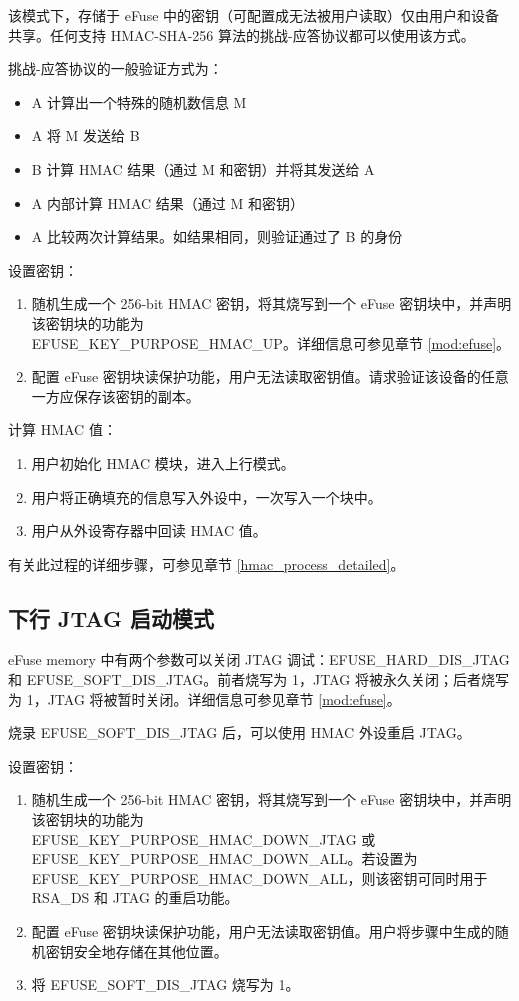 \documentclass[main\_\_CN.tex]{subfiles}
\begin{document}
该模式下，存储于 eFuse 中的密钥（可配置成无法被用户读取）仅由用户和设备共享。任何支持 HMAC-SHA-256 算法的挑战-应答协议都可以使用该方式。

挑战-应答协议的一般验证方式为：

\begin{itemize}
    \item A 计算出一个特殊的随机数信息 M
    \item A 将 M 发送给 B
    \item B 计算 HMAC 结果（通过 M 和密钥）并将其发送给 A
    \item A 内部计算 HMAC 结果（通过 M 和密钥）
    \item A 比较两次计算结果。如结果相同，则验证通过了 B 的身份
\end{itemize}

设置密钥：
\begin{enumerate}
    \item 随机生成一个 256-bit HMAC 密钥，将其烧写到一个 eFuse 密钥块中，并声明该密钥块的功能为\\ EFUSE\_KEY\_PURPOSE\_HMAC\_UP。详细信息可参见章节 \ref{mod:efuse}。
    \item 配置 eFuse 密钥块读保护功能，用户无法读取密钥值。请求验证该设备的任意一方应保存该密钥的副本。
\end{enumerate}

计算 HMAC 值：

\begin{enumerate}
    \item 用户初始化 HMAC 模块，进入上行模式。
    \item 用户将正确填充的信息写入外设中，一次写入一个块中。
    \item 用户从外设寄存器中回读 HMAC 值。
\end{enumerate}

有关此过程的详细步骤，可参见章节 \ref{hmac_process_detailed}。

\subsection{下行 JTAG 启动模式}

eFuse memory 中有两个参数可以关闭 JTAG 调试：EFUSE\_HARD\_DIS\_JTAG 和 EFUSE\_SOFT\_DIS\_JTAG。前者烧写为 1，JTAG 将被永久关闭；后者烧写为 1，JTAG 将被暂时关闭。详细信息可参见章节 \ref{mod:efuse}。

烧录 EFUSE\_SOFT\_DIS\_JTAG 后，可以使用 HMAC 外设重启 JTAG。

设置密钥：
\begin{enumerate}
    \item 随机生成一个 256-bit HMAC 密钥，将其烧写到一个 eFuse 密钥块中，并声明该密钥块的功能为\\ EFUSE\_KEY\_PURPOSE\_HMAC\_DOWN\_JTAG 或 EFUSE\_KEY\_PURPOSE\_HMAC\_DOWN\_ALL。若设置为 EFUSE\_KEY\_PURPOSE\_HMAC\_DOWN\_ALL，则该密钥可同时用于 RSA\_DS 和 JTAG 的重启功能。
    \item 配置 eFuse 密钥块读保护功能，用户无法读取密钥值。用户将步骤中生成的随机密钥安全地存储在其他位置。
    \item 将 EFUSE\_SOFT\_DIS\_JTAG 烧写为 1。
\end{enumerate}
\end{document}
